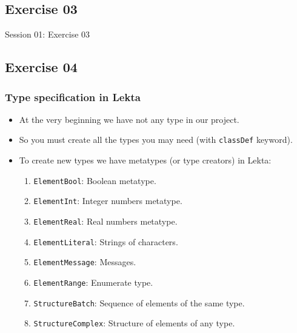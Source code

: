 \documentclass[11pt]{beamer}
\begin{document}
\subsection{Exercise 03}

\begin{frame}[fragile]
\Huge
\begin{center}
Session 01: Exercise 03
\end{center}
\end{frame}

\subsection{Exercise 04}

\begin{frame}[fragile]
\frametitle{Type specification in Lekta}
\begin{itemize}
	\item At the very beginning we have not any type in our project.
	\pause
	\item So you must create all the types you may need (with \texttt{classDef} keyword).
	\pause
	\item To create new types we have metatypes (or type creators) in Lekta:
	\begin{enumerate}
		\item \texttt{ElementBool}: Boolean metatype.
		\item \texttt{ElementInt}: Integer numbers metatype.
		\item \texttt{ElementReal}: Real numbers metatype.
		\item \texttt{ElementLiteral}: Strings of characters.
		\item \texttt{ElementMessage}: Messages.
		\item \texttt{ElementRange}: Enumerate type.
		\item \texttt{StructureBatch}: Sequence of elements of the same type.
		\item \texttt{StructureComplex}: Structure of elements of any type.
	\end{enumerate}
\end{itemize}
\end{frame}
\end{document}
